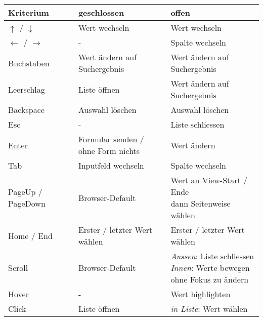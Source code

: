 \begin{table}[ht!]
    \label{table:interactionNewComponent}
    \footnotesize
    \begin{threeparttable}
        \begin{tabular}{ l || l | l }
            \bf{Kriterium}    & \bf{geschlossen} & \bf{offen} \\
            \hline \hline
            $\uparrow$ / $\downarrow$     & Wert wechseln       & Wert wechseln       \\
            \hline
            $\leftarrow$ / $\rightarrow$  & -                   & Spalte wechseln     \\
            \hline
            Buchstaben  & Wert ändern auf Suchergebnis\tnote{1} & Wert ändern auf Suchergebnis\tnote{1}  \\
            \hline
            Leerschlag  & Liste öffnen    & Wert ändern auf Suchergebnis\tnote{1}     \\
            \hline
            Backspace   & Auswahl löschen & Auswahl löschen        \\
            \hline
            Esc         & -               & Liste schliessen       \\
            \hline \hline
            Enter       & \tbbr{Formular senden / \\ ohne Form nichts} & Wert ändern  \\
            \hline
            Tab         & Inputfeld wechseln              & Spalte wechseln     \\
            \hline
            PageUp / PageDown  & Browser-Default\tnote{2} & \tbbr{Wert an View-Start / Ende \\ dann Seitenweise wählen} \\
            \hline
            Home / End & Erster / letzter Wert wählen     & Erster / letzter Wert wählen  \\
            \hline \hline
            Scroll     & Browser-Default\tnote{2}         & \tbbr{\textit{Aussen}: Liste schliessen \\
                                                                  \textit{Innen}: Werte bewegen \\ ohne Fokus zu ändern} \\
            \hline
            Hover      & -                & Wert highlighten       \\
            \hline
            Click      & Liste öffnen     & \tbbr{\textit{in Liste}: Wert wählen \\
}
\end{tabular}
\end{threeparttable}
\end{table}
